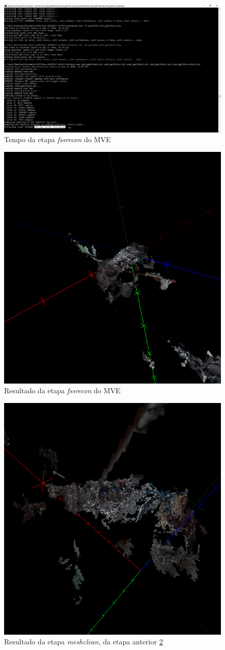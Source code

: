 \begin{figure}[!h]
	\centering
	\includegraphics[width=0.5\linewidth]{figs/mvefssrecongalinha.png}
	\caption{%
	Tempo da etapa \emph{fssrecon} do MVE
	}\label{fig:fssrecon}
\end{figure}

\begin{figure}[!h]
	\centering
	\includegraphics[width=0.5\linewidth]{figs/galinhadmr.png}
	\caption{%
	Resultado da etapa \emph{fssrecon} do MVE
	}\label{fig:galinhaFssr}
\end{figure}

\begin{figure}[!h]
	\centering
	\includegraphics[width=0.5\linewidth]{figs/galinhameshclean.png}
	\caption{%
	Resultado da etapa \emph{meshclean}, da etapa anterior \ref{fig:galinhaFssr}
	}\label{fig:galinhaMeshClean}
\end{figure}

